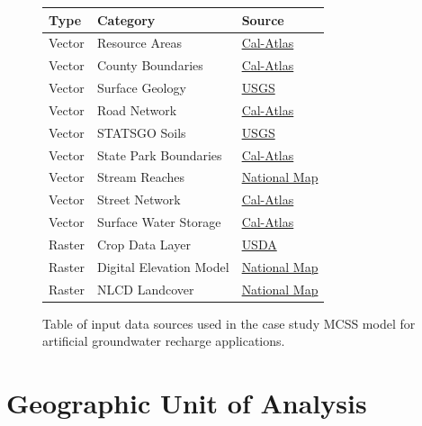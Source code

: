     \begin{figure}[!h]
        \begin{center}
            \begin{tabular*}{0.45\textwidth}{| l | l | l |}
                \textbf{Type} & \textbf{Category} & \textbf{Source} \\ \hline
                Vector & Resource Areas & \href{http://www.atlas.ca.gov/download.html}{Cal-Atlas} \\ \hline
                Vector & County Boundaries & \href{http://www.atlas.ca.gov/download.html}{Cal-Atlas} \\ \hline
                Vector & Surface Geology & \href{http://mrdata.usgs.gov/geology/state/state.php?state=CA}{USGS} \\ \hline
                Vector & Road Network & \href{http://www.atlas.ca.gov/download.html}{Cal-Atlas} \\ \hline
                Vector & STATSGO Soils & \href{http://water.usgs.gov/GIS/metadata/usgswrd/XML/ussoils.xml#stdorder}{USGS} \\ \hline
                Vector & State Park Boundaries & \href{http://www.atlas.ca.gov/download.html}{Cal-Atlas} \\ \hline
                Vector & Stream Reaches & \href{http://viewer.nationalmap.gov/viewer/}{National Map} \\ \hline
                Vector & Street Network & \href{http://www.atlas.ca.gov/download.html}{Cal-Atlas} \\ \hline
                Vector & Surface Water Storage & \href{http://www.atlas.ca.gov/download.html}{Cal-Atlas} \\ \hline
                Raster & Crop Data Layer & \href{http://www.nass.usda.gov/research/Cropland/SARS1a.htm}{USDA} \\ \hline
                Raster & Digital Elevation Model & \href{http://viewer.nationalmap.gov/viewer/}{National Map} \\ \hline
                Raster & NLCD Landcover & \href{http://viewer.nationalmap.gov/viewer/}{National Map} \\ 
           \end{tabular*}
    \end{center}
    \caption{Table of input data sources used in the case study MCSS model for artificial groundwater recharge applications.}
    \label{fig:DataSources}
    \end{figure}

\section{Geographic Unit of Analysis}
    
